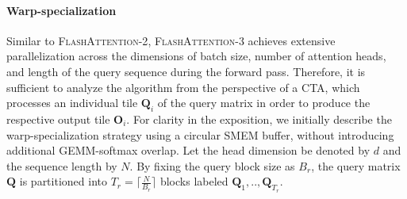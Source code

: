 \paragraph{Warp-specialization}
Similar to \textsc{FlashAttention-2}, \textsc{FlashAttention-3} achieves extensive parallelization across the dimensions of batch size, number of attention heads, and length of the query sequence during the forward pass. Therefore, it is sufficient to analyze the algorithm from the perspective of a CTA, which processes an individual tile $\mathbf{Q}_i$ of the query matrix in order to produce the respective output tile $\mathbf{O}_i$. For clarity in the exposition, we initially describe the warp-specialization strategy using a circular SMEM buffer, without introducing additional GEMM-softmax overlap. Let the head dimension be denoted by $d$ and the sequence length by $N$. By fixing the query block size as $B_r$, the query matrix $\mathbf{Q}$ is partitioned into $T_r = \lceil \frac{N}{B_r} \rceil$ blocks labeled $\mathbf{Q}_1, .., \mathbf{Q}_{T_r}$.

